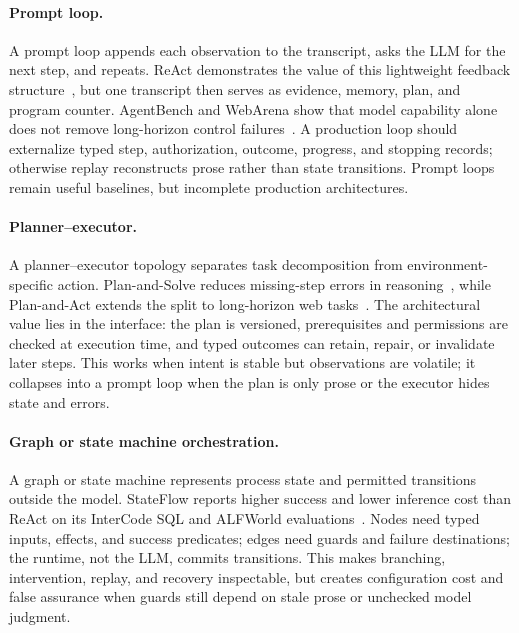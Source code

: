 \paragraph{Prompt loop.}
A prompt loop appends each observation to the transcript, asks the LLM for the next step, and repeats. ReAct demonstrates the value of this lightweight feedback structure~\cite{yao2023react}, but one transcript then serves as evidence, memory, plan, and program counter. AgentBench and WebArena show that model capability alone does not remove long-horizon control failures~\cite{liu2024agentbench,zhou2024webarena}. A production loop should externalize typed step, authorization, outcome, progress, and stopping records; otherwise replay reconstructs prose rather than state transitions. Prompt loops remain useful baselines, but incomplete production architectures.

\paragraph{Planner--executor.}
A planner--executor topology separates task decomposition from environment-specific action. Plan-and-Solve reduces missing-step errors in reasoning~\cite{wang2023planandsolve}, while Plan-and-Act extends the split to long-horizon web tasks~\cite{erdogan2025planandact}. The architectural value lies in the interface: the plan is versioned, prerequisites and permissions are checked at execution time, and typed outcomes can retain, repair, or invalidate later steps. This works when intent is stable but observations are volatile; it collapses into a prompt loop when the plan is only prose or the executor hides state and errors.

\paragraph{Graph or state machine orchestration.}
A graph or state machine represents process state and permitted transitions outside the model. StateFlow reports higher success and lower inference cost than ReAct on its InterCode SQL and ALFWorld evaluations~\cite{wu2024stateflow}. Nodes need typed inputs, effects, and success predicates; edges need guards and failure destinations; the runtime, not the LLM, commits transitions. This makes branching, intervention, replay, and recovery inspectable, but creates configuration cost and false assurance when guards still depend on stale prose or unchecked model judgment.


